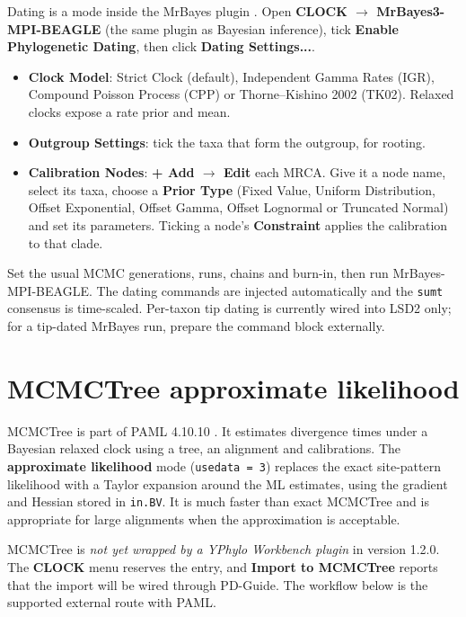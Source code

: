 \documentclass[10pt]{report}
\begin{document}
Dating is a mode inside the MrBayes plugin \cite{mrbayes}. Open
\textbf{CLOCK $\rightarrow$ MrBayes3-MPI-BEAGLE} (the same plugin as Bayesian
inference), tick
\textbf{Enable Phylogenetic Dating}, then click \textbf{Dating Settings...}.

\begin{itemize}
  \item \textbf{Clock Model}: Strict Clock (default), Independent Gamma Rates
        (IGR), Compound Poisson Process (CPP) or Thorne--Kishino 2002 (TK02).
        Relaxed clocks expose a rate prior and mean.
  \item \textbf{Outgroup Settings}: tick the taxa that form the outgroup, for
        rooting.
  \item \textbf{Calibration Nodes}: \textbf{+ Add $\rightarrow$ Edit} each
        MRCA. Give it a node name, select its taxa, choose a \textbf{Prior
        Type} (Fixed Value, Uniform Distribution, Offset Exponential, Offset
        Gamma, Offset Lognormal or Truncated Normal) and set its parameters.
        Ticking a node's \textbf{Constraint} applies the calibration to that
        clade.
\end{itemize}

Set the usual MCMC generations, runs, chains and burn-in, then run
MrBayes-MPI-BEAGLE. The dating commands are injected automatically and the
\texttt{sumt} consensus is time-scaled. Per-taxon tip dating is currently wired
into LSD2 only; for a tip-dated MrBayes run, prepare the command block
externally.

\section{MCMCTree approximate likelihood}

MCMCTree is part of PAML 4.10.10 \cite{paml,mcmctree}. It estimates divergence
times under a Bayesian relaxed clock using a tree, an alignment and
calibrations. The
\textbf{approximate likelihood} mode (\texttt{usedata = 3}) replaces the exact
site-pattern likelihood with a Taylor expansion around the ML estimates, using
the gradient and Hessian stored in \texttt{in.BV}. It is much faster than exact
MCMCTree and is appropriate for large alignments when the approximation is
acceptable.

\begin{warning}
MCMCTree is \emph{not yet wrapped by a YPhylo Workbench plugin} in version
1.2.0. The \textbf{CLOCK} menu reserves the entry, and \textbf{Import to
MCMCTree} reports that the import will be wired through PD-Guide. The workflow
below is the supported external route with PAML.
\end{warning}
\end{document}

